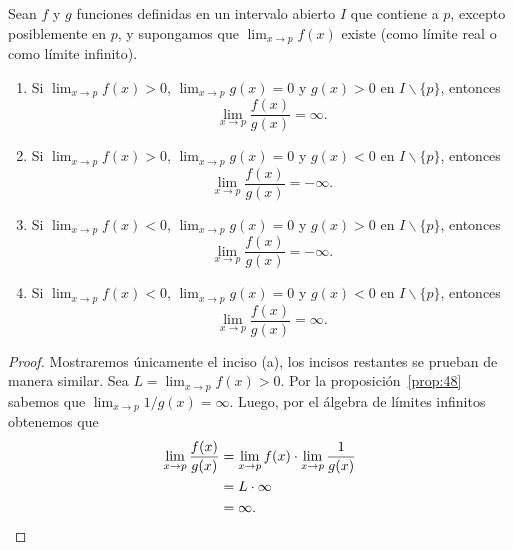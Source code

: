 \documentclass[12pt,a4paper]{book}
\begin{document}
    \begin{proposicion}\label{prop:49}
        Sean $f$ y $g$ funciones definidas en un intervalo abierto $I$ que
        contiene a $p$, excepto posiblemente en $p$, y supongamos que $\lim_{x\to p}f(x)$
        existe (como límite real o como límite infinito).
        \begin{enumerate}
            \item Si $\displaystyle\lim_{x\to p}f(x)>0$, $\displaystyle\lim_{x\to p}g(x)=0$ y $g(x)>0$ en $I\backslash\{p\}$, entonces
            \begin{equation*}
                \lim_{x\to p}\frac{f(x)}{g(x)}=\infty.
            \end{equation*}
            \item Si $\displaystyle\lim_{x\to p}f(x)>0$, $\displaystyle\lim_{x\to p}g(x)=0$ y $g(x)<0$ en $I\backslash\{p\}$, entonces
            \begin{equation*}
                \lim_{x\to p}\frac{f(x)}{g(x)}=-\infty.
            \end{equation*}
            \item Si $\displaystyle\lim_{x\to p}f(x)<0$, $\displaystyle\lim_{x\to p}g(x)=0$ y $g(x)>0$ en $I\backslash\{p\}$, entonces
            \begin{equation*}
                \lim_{x\to p}\frac{f(x)}{g(x)}=-\infty.
            \end{equation*}
            \item Si $\displaystyle\lim_{x\to p}f(x)<0$, $\displaystyle\lim_{x\to p}g(x)=0$ y $g(x)<0$ en $I\backslash\{p\}$, entonces
            \begin{equation*}
                \lim_{x\to p}\frac{f(x)}{g(x)}=\infty.
            \end{equation*}
        \end{enumerate}
    \end{proposicion}

    \begin{proof}
        Mostraremos únicamente el inciso (a), los incisos restantes se
        prueban de manera similar. Sea $L=\lim_{x\to p}f(x)>0$. Por la proposición~\ref{prop:48}
        sabemos que $\lim_{x\to p}1/g(x)=\infty$. Luego, por el álgebra de límites infinitos
        obtenemos que
        \begin{align*}
            \lim_{x\to p}\frac{f(x)}{g(x)}&=\lim_{x\to p}f(x)\cdot\lim_{x\to p}\frac{1}{g(x)}\\
            &=L\cdot\infty\\
            &=\infty.\qedhere
        \end{align*}
    \end{proof}
\end{document}
